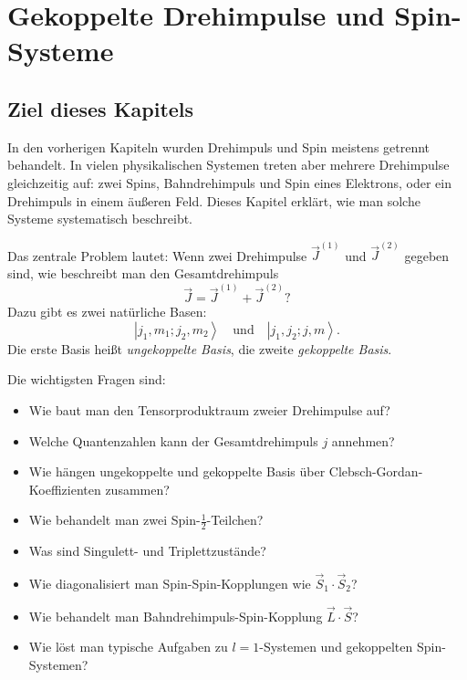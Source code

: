 \providecommand{\ket}[1]{\left|#1\right\rangle}
\providecommand{\bra}[1]{\left\langle#1\right|}
\providecommand{\braket}[2]{\left\langle#1\middle|#2\right\rangle}
\providecommand{\mel}[3]{\left\langle#1\middle|#2\middle|#3\right\rangle}
\providecommand{\ii}{\mathrm{i}}
\providecommand{\e}{\mathrm{e}}
\providecommand{\idop}{\mathbf{1}}
\providecommand{\vecJ}{\vec J}
\providecommand{\vecL}{\vec L}
\providecommand{\vecS}{\vec S}
\providecommand{\epsijk}{\varepsilon_{ijk}}

\chapter{Gekoppelte Drehimpulse und Spin-Systeme}

\section{Ziel dieses Kapitels}

In den vorherigen Kapiteln wurden Drehimpuls und Spin meistens getrennt behandelt. In vielen physikalischen Systemen treten aber mehrere Drehimpulse gleichzeitig auf: zwei Spins, Bahndrehimpuls und Spin eines Elektrons, oder ein Drehimpuls in einem äußeren Feld. Dieses Kapitel erklärt, wie man solche Systeme systematisch beschreibt.

\begin{conceptbox}
Das zentrale Problem lautet: Wenn zwei Drehimpulse \(\vec J^{(1)}\) und \(\vec J^{(2)}\) gegeben sind, wie beschreibt man den Gesamtdrehimpuls
\[
    \vec J = \vec J^{(1)}+\vec J^{(2)}?
\]
Dazu gibt es zwei natürliche Basen:
\[
    \ket{j_1,m_1;j_2,m_2}
    \quad \text{und} \quad
    \ket{j_1,j_2;j,m}.
\]
Die erste Basis heißt \emph{ungekoppelte Basis}, die zweite \emph{gekoppelte Basis}.
\end{conceptbox}

Die wichtigsten Fragen sind:
\begin{itemize}
    \item Wie baut man den Tensorproduktraum zweier Drehimpulse auf?
    \item Welche Quantenzahlen kann der Gesamtdrehimpuls \(j\) annehmen?
    \item Wie hängen ungekoppelte und gekoppelte Basis über Clebsch-Gordan-Koeffizienten zusammen?
    \item Wie behandelt man zwei Spin-\(\frac12\)-Teilchen?
    \item Was sind Singulett- und Triplettzustände?
    \item Wie diagonalisiert man Spin-Spin-Kopplungen wie \(\vec S_1\cdot \vec S_2\)?
    \item Wie behandelt man Bahndrehimpuls-Spin-Kopplung \(\vec L\cdot\vec S\)?
    \item Wie löst man typische Aufgaben zu \(l=1\)-Systemen und gekoppelten Spin-Systemen?
\end{itemize}

